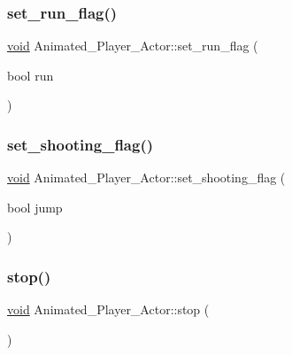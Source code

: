\subsubsection{\texorpdfstring{set\+\_\+run\+\_\+flag()}{set\_run\_flag()}}
{\footnotesize\ttfamily \hyperlink{imgui__impl__opengl3__loader_8h_ac668e7cffd9e2e9cfee428b9b2f34fa7}{void} Animated\+\_\+\+Player\+\_\+\+Actor\+::set\+\_\+run\+\_\+flag (\begin{DoxyParamCaption}\item[{bool}]{run }\end{DoxyParamCaption})\hspace{0.3cm}{\ttfamily [inline]}}

\mbox{\label{classAnimated__Player__Actor_a48472acfb2041970e148be3a99d6fcaa}} 
\subsubsection{\texorpdfstring{set\+\_\+shooting\+\_\+flag()}{set\_shooting\_flag()}}
{\footnotesize\ttfamily \hyperlink{imgui__impl__opengl3__loader_8h_ac668e7cffd9e2e9cfee428b9b2f34fa7}{void} Animated\+\_\+\+Player\+\_\+\+Actor\+::set\+\_\+shooting\+\_\+flag (\begin{DoxyParamCaption}\item[{bool}]{jump }\end{DoxyParamCaption})\hspace{0.3cm}{\ttfamily [inline]}}

\mbox{\label{classAnimated__Player__Actor_a67f7bb9c2544d32c2d35a29c4e245f10}} 
\subsubsection{\texorpdfstring{stop()}{stop()}}
{\footnotesize\ttfamily \hyperlink{imgui__impl__opengl3__loader_8h_ac668e7cffd9e2e9cfee428b9b2f34fa7}{void} Animated\+\_\+\+Player\+\_\+\+Actor\+::stop (\begin{DoxyParamCaption}{ }\end{DoxyParamCaption})}

